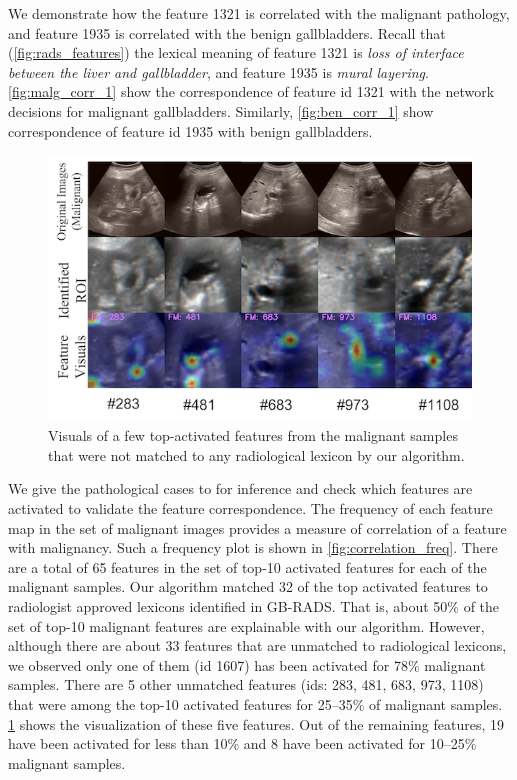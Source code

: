 %
\par We demonstrate how the feature 1321 is correlated with the malignant pathology, and feature 1935 is correlated with the benign gallbladders. Recall that (\cref{fig:rads_features}) the lexical meaning of feature 1321 is \emph{loss of interface between the liver and gallbladder}, and feature 1935 is \emph{mural layering}. \cref{fig:malg_corr_1} show the correspondence of feature id 1321 with the network decisions for malignant gallbladders. Similarly, \cref{fig:ben_corr_1} show correspondence of feature id 1935 with benign gallbladders. 
%
\begin{figure}[!ht]
    \centering
    \includegraphics[width=0.75\linewidth]{figs/radformer/all-unmatched.png}
    \caption[Visuals of few top-activated unmatched features]{Visuals of a few top-activated features from the malignant samples that were not matched to any radiological lexicon by our algorithm.}
    \label{fig:unknown-new}
\end{figure}
%
\par We give the pathological cases to \radformer for inference and check which features are activated to validate the feature correspondence. The frequency of each feature map in the set of malignant images provides a measure of correlation of a feature with malignancy. Such a frequency plot is shown in \cref{fig:correlation_freq}. There are a total of 65 features in the set of top-10 activated features for each of the malignant samples. Our algorithm matched 32 of the top activated features to radiologist approved lexicons identified in GB-RADS. That is, about 50\% of the set of top-10 malignant features are explainable with our algorithm. However, although there are about 33 features that are unmatched to radiological lexicons, we observed only one of them (id 1607) has been activated for 78\% malignant samples. There are 5 other unmatched features (ids: 283, 481, 683, 973, 1108) that were among the top-10 activated features for 25--35\% of malignant samples. \cref{fig:unknown-new} shows the visualization of these five features. Out of the remaining features, 19 have been activated for less than 10\% and 8 have been activated for 10--25\% malignant samples.
